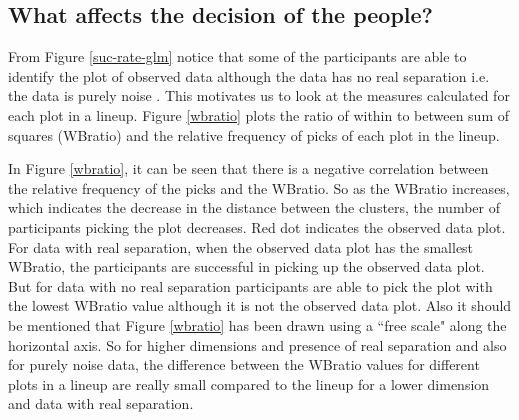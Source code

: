 \documentclass[12]{article}
\begin{document}

\subsection{What affects the decision of the people?}

\normalsize

From Figure \ref{suc-rate-glm} notice that some of the participants are able to identify the plot of observed data  although the data has no real separation i.e. the data is purely noise . This motivates us to look at the measures calculated for each plot in a lineup. Figure \ref{wbratio} plots the ratio of within to between sum of squares (WBratio) and the relative frequency of picks of each plot in the lineup.

In Figure \ref{wbratio}, it can be seen that there is a negative correlation between the relative frequency of the picks and the WBratio. So as the WBratio increases, which indicates the decrease in the distance between the clusters,  the number of participants picking the plot decreases. Red dot indicates the observed data plot. For data with real separation, when the observed data plot has the smallest WBratio, the participants are successful in picking up the observed data plot. But for data with no real separation participants are able to pick the plot with the lowest WBratio value although it is not the observed data plot. Also it should be mentioned that Figure \ref{wbratio} has been drawn using a ``free scale" along the horizontal axis. So for higher dimensions and presence of real separation and also for purely noise data, the difference between the WBratio values for different plots in a lineup are really small compared to the lineup for a lower dimension and data with real separation.  
\end{document}
